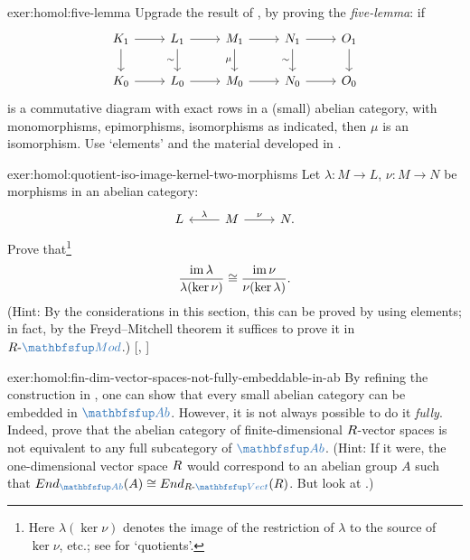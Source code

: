 \begin{exer}{}{exer:homol:five-lemma}
  Upgrade the result of , by proving
  the \emph{five-lemma}: if
  \[\begin{tikzcd}
      K_1 \arrow[r] \arrow[d] & L_1 \arrow[r] \arrow[d, "\sim"'] & M_1
      \arrow[r] \arrow[d, "\mu"'] &
      N_1 \arrow[r] \arrow[d, "\sim"'] & O_1 \arrow[d] \\
      K_0 \arrow[r] & L_0 \arrow[r] & M_0 \arrow[r] & N_0 \arrow[r] &
      O_0
    \end{tikzcd}\] is a commutative diagram with exact rows in a
  (small) abelian category, with monomorphisms, epimorphisms,
  isomorphisms as indicated, then $\mu$ is an isomorphism. Use
  `elements' and the material developed in
  .
\end{exer}
\begin{exer}{}{exer:homol:quotient-iso-image-kernel-two-morphisms}
  \exerused{} Let $\lambda : M \to L$, $\nu : M \to N$ be morphisms in
  an abelian category:
  \[\begin{tikzcd}
      L & M \arrow[l, "\lambda"'] \arrow[r, "\nu"] & N.
    \end{tikzcd}\] Prove that\footnote{Here $\lambda(\ker\nu)$ denotes
    the image of the restriction of $\lambda$ to the source of
    $\ker\nu$, etc.; see  for `quotients'.}
  \[
    \frac{\operatorname{im}\lambda}{\lambda(\ker\nu)} \cong
    \frac{\operatorname{im}\nu}{\nu(\ker\lambda)}.
  \]
  (Hint: By the considerations in this section, this can be proved by
  using elements; in fact, by the Freyd--Mitchell theorem it suffices
  to prove it in $R\text{-}\categ{Mod}$.)
  [,
  ]
\end{exer}
\begin{exer}{}{exer:homol:fin-dim-vector-spaces-not-fully-embeddable-in-ab}
  By refining the construction in
  ,
  one can show that every small abelian category can be embedded in
  $\categ{Ab}$. However, it is not always possible to do it
  \emph{fully}. Indeed, prove that the abelian category of
  finite-dimensional $R$-vector spaces is not equivalent to any full
  subcategory of $\categ{Ab}$.  (Hint: If it were, the one-dimensional
  vector space $R$ would correspond to an abelian group $A$ such that
  $\End_{\categ{Ab}}(A) \cong
  \End_{\R\text{-}\categ{Vect}}(\R)$.  But look at
  .)
\end{exer}
